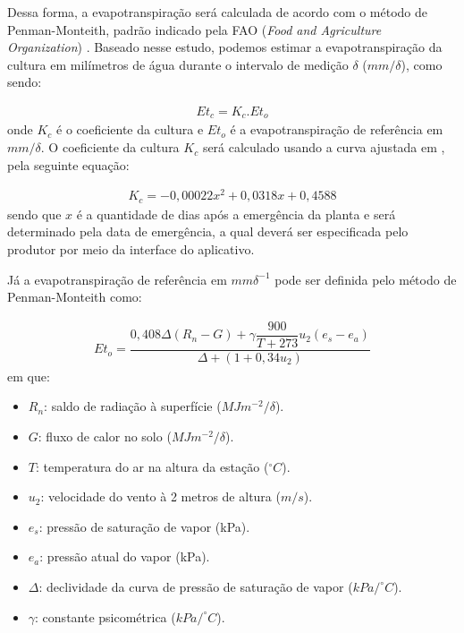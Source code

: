 		Dessa forma, a evapotranspiração será calculada de acordo com o método de Penman-Monteith, padrão indicado pela FAO (\emph{Food and Agriculture Organization}) \cite{bib_sen_02_victor}. Baseado nesse estudo, podemos estimar a evapotranspiração da cultura em milímetros de água durante o intervalo de medição $\delta$ ($mm/\delta$), como sendo:

		\begin{eqnarray}
			Et_c = K_c.Et_o
		\end{eqnarray}
		onde $K_c$ é o coeficiente da cultura e $Et_o$ é a evapotranspiração de referência em $mm/\delta$. O coeficiente da cultura $K_c$  será calculado usando a curva ajustada em \cite{bib_sen_03_victor}, pela seguinte equação:

		\begin{eqnarray}
			K_c = -0,00022x^2 + 0,0318x + 0,4588
		\end{eqnarray}
		sendo que $x$ é a quantidade de dias após a emergência da planta e será determinado pela data de emergência, a qual deverá ser especificada pelo produtor por meio da interface do aplicativo. 

		Já a evapotranspiração de referência em $mm \delta ^{-1}$ pode ser definida pelo método de Penman-Monteith como:

		\begin{eqnarray}
		Et_{o}=\dfrac {0,408\Delta\left( R_{n}-G\right) +\gamma \dfrac {900}{T+273}u_2\left( e_{s}-e_{a}\right) }{\Delta +\left( 1+0,34u_2\right) }
		\end{eqnarray}
		em que:
		\begin{itemize}
			\renewcommand{\labelitemi}{$\Rightarrow$}
			\item $R_n$: saldo de radiação à superfície ($MJ m^{-2}/\delta$).
			\item $G$: fluxo de calor no solo ($MJ m^{-2}/\delta$).
			\item $T$: temperatura do ar na altura da estação ($^{\circ}C$).
			\item $u_2$: velocidade do vento à 2 metros de altura ($m/s$).
			\item $e_s$: pressão de saturação de vapor (kPa).
			\item $e_a$: pressão atual do vapor (kPa).
			\item $\Delta$: declividade da curva de pressão de saturação de vapor ($kPa/^{\circ}C$).
			\item $\gamma$: constante psicométrica ($kPa/^{\circ}C$).
		\end{itemize}
		
